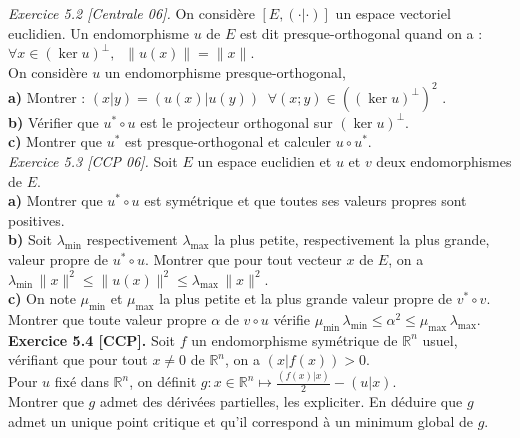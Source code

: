 \documentclass[a4paper,12pt,francais]{article}
\newcommand{\field}[1]{\mathbb{#1}}
\newcommand{\R}{\field{R}}
\begin{document}
\noindent
{\it Exercice 5.2 [Centrale 06].} On considère $[E,(\cdot|\cdot)]$ un espace vectoriel
euclidien. Un endomorphisme $u$ de $E$ est dit presque-orthogonal
quand on a : $\forall x \in (\ker u)^\perp,\; \; \|u(x)\|=\|x\|$.\\
On considère $u$ un endomorphisme presque-orthogonal,\\
\indent
{\bf a)} Montrer : $(x|y)=(u(x)|u(y))\; \; \forall (x;y)\in {\left( \left(\ker
u\right)^\perp \right)}^2 $ .\\
\indent
{\bf b)} Vérifier que $u^* \circ u$ est le projecteur orthogonal sur
$(\ker u)^\perp$.\\
\indent
{\bf c)} Montrer que $u^*$ est presque-orthogonal et calculer $u\circ u^*$.\\

\noindent
{\it Exercice 5.3 [CCP 06].} Soit $E$ un espace euclidien et $u$ et
$v$ deux endomorphismes de $E$. \\
{\bf a)} Montrer que $u^* \circ u$ est symétrique et que toutes ses
valeurs propres sont positives.\\
{\bf b)} Soit $\lambda_{\min}$ respectivement $\lambda_{\max}$ la plus
petite, respectivement la plus grande, valeur propre de $u^* \circ
u$. Montrer que pour tout vecteur $x$ de $E$, on a $\lambda_{\min} \, \|x\|^2
\leqslant \|u(x)\|^2\leqslant \lambda_{\max} \, \|x\|^2$.\\
{\bf c)} On note $\mu_{\min}$ et $\mu_{\max}$ la plus
petite et la plus grande valeur propre de $v^* \circ
v$. Montrer que toute valeur propre $\alpha$ de $v \circ u$ vérifie 
$\mu_{\min} \, \lambda_{\min} \leqslant \alpha^2 \leqslant  
\mu_{\max} \, \lambda_{\max}$.\\


\noindent
{\bf Exercice 5.4 [CCP].} Soit $f$ un endomorphisme symétrique de $\R^n$ usuel, vérifiant 
que pour tout $x\neq 0$ de $\R^n$, on a $(x|f(x))>0$.\\
Pour $u$ fixé dans $\R^n$, on définit $g: x\in \R^n \mapsto
\frac{(f(x)|x)}{2}-(u|x)$.\\
Montrer que $g$ admet des dérivées partielles, les expliciter. En
déduire que $g$ admet un unique point critique et qu'il correspond à
un minimum global de $g$.\\
\end{document}
